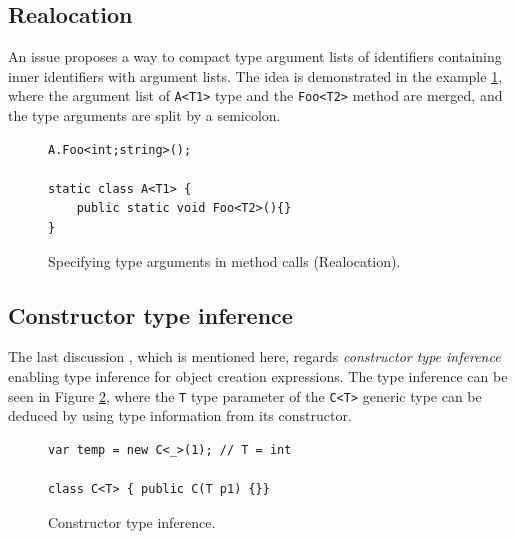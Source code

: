 \subsection{Realocation} \label{sect13:is8}

An issue \cite{online:Realloc} proposes a way to compact type argument lists of identifiers containing inner identifiers with argument lists. 
The idea is demonstrated in the example \ref{img25:Realloc}, where the argument list of \texttt{A<T1>} type and the \texttt{Foo<T2>} method are merged, and the type arguments are split by a semicolon.
\begin{figure}[h]
\begin{lstlisting}[style=csharp]
A.Foo<int;string>();

static class A<T1> {
    public static void Foo<T2>(){}
}
\end{lstlisting}
\caption{Specifying type arguments in method calls (Realocation).}
\label{img25:Realloc}
\end{figure}

\subsection{Constructor type inference} \label{sect14:is9}

The last discussion \cite{online:CtorTInf}, which is mentioned here, regards \textit{constructor type inference} enabling type inference for object creation expressions. 
The type inference can be seen in Figure \ref{img26:CtorTInf}, where the \texttt{T} type parameter of the \texttt{C<T>} generic type can be deduced by using type information from its constructor.
\begin{figure}[h]
\begin{lstlisting}[style=csharp]
var temp = new C<_>(1); // T = int

class C<T> { public C(T p1) {}}
\end{lstlisting}
\caption{Constructor type inference.}
\label{img26:CtorTInf}
\end{figure}